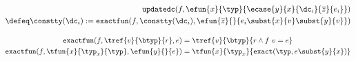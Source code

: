 \begin{align*}
\updatedcty{f}{\efun{x}{\typ}{\ecase{y}{x}{\dc_i}{\overline{z}}{e_i}}}\\
 \defeq 
 \constty(\dc_i) := \exacttypefun{f}{\constty(\dc_i)}{\efun{\overline{z}}{}{e_i\subst{x}{v}\subst{y}{v}}}
\end{align*}

\begin{align*}
\exacttypefun{f}{\tref{v}{\btyp}{r}}{e} &= \tref{v}{\btyp}{r \land f\ v = e}\\
\exacttypefun{f}{\tfun{x}{\typ_x}{\typ}}{\efun{y}{}{e}} &=\tfun{x}{\typ_x}{\exacttype{\typ}{e\subst{y}{x}}} 
\end{align*}
